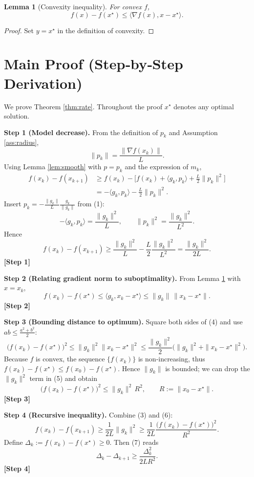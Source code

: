 \documentclass{article}
\newtheorem{lemma}{Lemma}
\begin{document}
\begin{lemma}[Convexity inequality]\label{lem:convex}
For convex $f$,
\[
f(x)-f(x^\star)\le\langle\nabla f(x),x-x^\star\rangle .
\]
\end{lemma}
\begin{proof}
Set $y=x^\star$ in the definition of convexity. \qedhere
\end{proof}

\section*{Main Proof (Step‑by‑Step Derivation)}
We prove Theorem \ref{thm:rate}. Throughout the proof $x^\star$ denotes any optimal solution.

\noindent\textbf{Step 1 (Model decrease).}  
From the definition of $p_k$ and Assumption \ref{ass:radius},
\[
\|p_k\|=\frac{\|\nabla f(x_k)\|}{L}. \tag{1}
\]
Using Lemma \ref{lem:smooth} with $p=p_k$ and the expression of $m_k$,
\[
\begin{aligned}
f(x_k)-f(x_{k+1})
&\ge f(x_k)-\bigl[f(x_k)+\langle g_k,p_k\rangle+\tfrac{L}{2}\|p_k\|^{2}\bigr]   \\
&= -\langle g_k,p_k\rangle-\tfrac{L}{2}\|p_k\|^{2}. \tag{2}
\end{aligned}
\]
Insert $p_k=-\frac{\|g_k\|}{L}\frac{g_k}{\|g_k\|}$ from (1):
\[
-\langle g_k,p_k\rangle = \frac{\|g_k\|^{2}}{L},\qquad
\|p_k\|^{2}= \frac{\|g_k\|^{2}}{L^{2}} .
\]
Hence
\[
f(x_k)-f(x_{k+1})\ge \frac{\|g_k\|^{2}}{L}-\frac{L}{2}\frac{\|g_k\|^{2}}{L^{2}}
= \frac{\|g_k\|^{2}}{2L}. \tag{3}
\]
\noindent\textbf{[Step 1]}

\noindent\textbf{Step 2 (Relating gradient norm to suboptimality).}  
From Lemma \ref{lem:convex} with $x=x_k$,
\[
f(x_k)-f(x^\star)\le \langle g_k,x_k-x^\star\rangle
\le \|g_k\|\,\|x_k-x^\star\|. \tag{4}
\]
\noindent\textbf{[Step 2]}

\noindent\textbf{Step 3 (Bounding distance to optimum).}  
Square both sides of (4) and use $ab\le\frac{a^{2}+b^{2}}{2}$:
\[
\bigl(f(x_k)-f(x^\star)\bigr)^{2}
\le \|g_k\|^{2}\|x_k-x^\star\|^{2}
\le \frac{\|g_k\|^{2}}{2}\bigl(\|g_k\|^{2}+ \|x_k-x^\star\|^{2}\bigr). \tag{5}
\]
Because $f$ is convex, the sequence $\{f(x_k)\}$ is non‑increasing, thus $f(x_k)-f(x^\star)\le f(x_0)-f(x^\star)$. Hence $\|g_k\|$ is bounded; we can drop the $\|g_k\|^{2}$ term in (5) and obtain
\[
\bigl(f(x_k)-f(x^\star)\bigr)^{2}
\le \|g_k\|^{2}\,R^{2},\qquad R:=\|x_0-x^\star\|. \tag{6}
\]
\noindent\textbf{[Step 3]}

\noindent\textbf{Step 4 (Recursive inequality).}  
Combine (3) and (6):
\[
f(x_k)-f(x_{k+1})
\ge \frac{1}{2L}\|g_k\|^{2}
\ge \frac{1}{2L}\frac{\bigl(f(x_k)-f(x^\star)\bigr)^{2}}{R^{2}}. \tag{7}
\]
Define $\Delta_k:=f(x_k)-f(x^\star)\ge0$. Then (7) reads
\[
\Delta_k-\Delta_{k+1}\ge \frac{\Delta_k^{2}}{2LR^{2}}. \tag{8}
\]
\noindent\textbf{[Step 4]}
\end{document}
